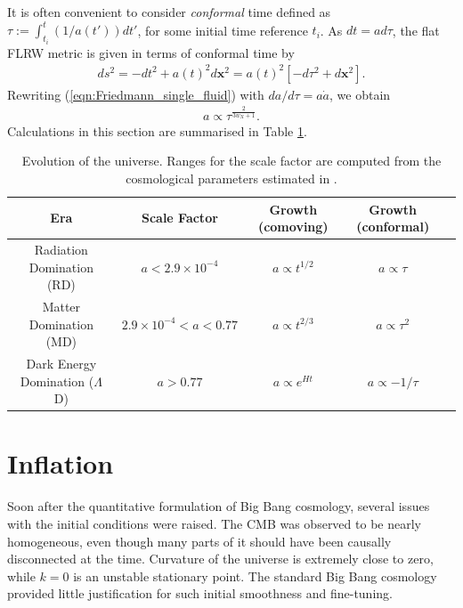 It is often convenient to consider \textit{conformal} time defined as $\tau := \int_{t_i}^{t} (1/a(t')) dt'$, for some initial time reference $t_i$. As $dt = ad\tau$, the flat FLRW metric is given in terms of conformal time by
\begin{align}
	ds^2 = -dt^2 + a(t)^2 d\mathbf{x}^2 = a(t)^2 \left[ -d\tau^2 + d\mathbf{x}^2 \right]. \label{eqn:conformal_time}
\end{align}
Rewriting (\ref{eqn:Friedmann_single_fluid}) with $da/d\tau = a \dot{a}$, we obtain
\begin{align}
	a \propto \tau^\frac{2}{3w_X+1}.
\end{align}
Calculations in this section are summarised in Table \ref{table:evolution_of_the_universe}.
\begin{table}[h]
	\caption{Evolution of the universe. Ranges for the scale factor are computed from the cosmological parameters estimated in \cite{PlanckCollaboration2018Parameters}.}
	\centering
	\label{table:evolution_of_the_universe}
	\renewcommand{\arraystretch}{1.5} 
	\begin{tabular}{c | c | c | c | c}
		Era & Scale Factor & Growth (comoving) & Growth (conformal) \\ 
		
		\hline
		Radiation Domination (RD) & $a < 2.9 \times 10^{-4}$ & $a \propto t^{1/2}$ & $a \propto \tau$ \\
		\hline
		Matter Domination (MD) & $ 2.9 \times 10^{-4} < a < 0.77 $ & $a \propto t^{2/3}$ & $a \propto \tau^2$ \\
		\hline
		Dark Energy Domination ($\Lambda$D) & $a > 0.77$ & $a \propto e^{Ht}$ & $a \propto -1/\tau$ \\
		
		\hline 
	\end{tabular}
\end{table}

\section{Inflation}

Soon after the quantitative formulation of Big Bang cosmology, several issues with the initial conditions were raised. The CMB was observed to be nearly homogeneous, even though many parts of it should have been causally disconnected at the time. Curvature of the universe is extremely close to zero, while $k=0$ is an unstable stationary point. The standard Big Bang cosmology provided little justification for such initial smoothness and fine-tuning.

